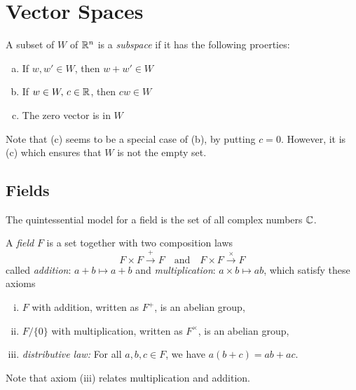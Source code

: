 

\chapter{Vector Spaces}

A subset of $W$ of $\mathbb{R}^n$ is a \emph{subspace} if it has the following proerties:
\begin{enumerate}[(a)]
    \item If $w,w'\in W$, then $w+w'\in W$
    \item If $w\in W,\, c\in \mathbb{R}$, then $cw\in W$
    \item The zero vector is in $W$
\end{enumerate}
Note that (c) seems to be a special case of (b), by putting $c=0$. However, it is (c) which ensures that $W$ is not the empty set.

\section{Fields}
\label{sec:fields}

The quintessential model for a field is the set of all complex numbers $\mathbb{C}$.

\begin{definition}
    A \emph{field} $F$ is a set together with two composition laws
    \begin{equation}
       F\times F \xrightarrow{+} F \quad\text{and}\quad F\times F \xrightarrow{\times} F
    \end{equation}
    called \emph{addition}: $a+b \mapsto a+b$ and \emph{multiplication}: $a\times b \mapsto ab$, which satisfy these axioms
    \begin{enumerate}[(i)]
        \makethislistcompact %

        \item $F$ with addition, written as $F^+$, is an abelian group,
        \item $F/\{0\}$ with multiplication, written as $F^\times$, is an abelian group,
        \item \emph{distributive law: } For all $a,b,c\in F$, we have $a(b+c) = ab + ac$.
    \end{enumerate}
\end{definition}
Note that axiom (iii) relates multiplication and addition.


